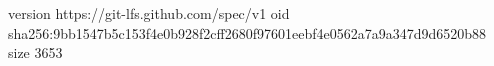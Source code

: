 version https://git-lfs.github.com/spec/v1
oid sha256:9bb1547b5c153f4e0b928f2cff2680f97601eebf4e0562a7a9a347d9d6520b88
size 3653
